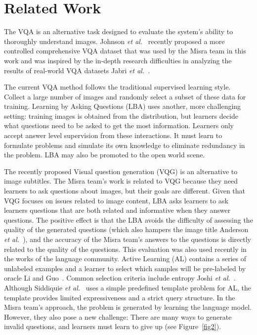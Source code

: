 \documentclass[10pt,twocolumn,letterpaper]{article}
\begin{document}
    \section{Related Work}
    The VQA is an alternative task designed to evaluate the system's ability to thoroughly understand images. Johnson \emph{et al.}~\cite{[23]} recently proposed a more controlled comprehensive VQA dataset that was used by the Misra team in this work and was inspired by the in-depth research difficulties in analyzing the results of real-world VQA datasets Jabri \emph{et al.}~\cite{[22]}.
    \par
    The current VQA method follows the traditional supervised learning style. Collect a large number of images and randomly select a subset of these data for training. Learning by Asking Questions (LBA) uses another, more challenging setting: training images is obtained from the distribution, but learners decide what questions need to be asked to get the most information. Learners only accept answer level supervision from these interactions. It must learn to formulate problems and simulate its own knowledge to eliminate redundancy in the problem. LBA may also be promoted to the open world scene.
    \par
    The recently proposed Visual question generation (VQG) is an alternative to image subtitles. The Misra team's work is related to VQG because they need learners to ask questions about images, but their goals are different. Given that VQG focuses on issues related to image content, LBA asks learners to ask learners questions that are both related and informative when they answer questions. The positive effect is that the LBA avoids the difficulty of assessing the quality of the generated questions (which also hampers the image title Anderson \emph{et al.}~\cite{[2]}), and the accuracy of the Misra team's answers to the questions is directly related to the quality of the questions. This evaluation was also used recently in the works of the language community. Active Learning (AL) contains a series of unlabeled examples and a learner to select which samples will be pre-labeled by oracle Li and Guo~\cite{[33]}. Common selection criteria include entropy Joshi \emph{et al.}~\cite{[25]}. Although Siddiquie \emph{et al.}~\cite{[49]} uses a simple predefined template problem for AL, the template provides limited expressiveness and a strict query structure. In the Misra team's approach, the problem is generated by learning the language model. However, they also pose a new challenge: There are many ways to generate invalid questions, and learners must learn to give up (see Figure~\ref{fig2}).
\end{document}
